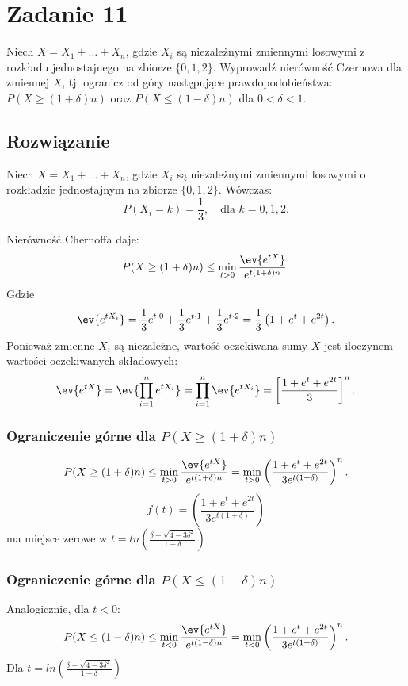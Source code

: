 \section{Zadanie 11}
Niech \(X = X_1 + \ldots + X_n\), gdzie \(X_i\) są niezależnymi zmiennymi losowymi z rozkładu jednostajnego na zbiorze \(\{0, 1, 2\}\). Wyprowadź nierówność Czernowa dla zmiennej \(X\), tj. ogranicz od góry następujące prawdopodobieństwa: \(P (X \geqslant (1 + \delta) n)\) oraz \(P (X \leqslant (1 - \delta) n)\) dla \(0 < \delta < 1\).
\subsection*{Rozwiązanie}

Niech \( X = X_1 + \ldots + X_n \), gdzie \( X_i \) są niezależnymi zmiennymi losowymi o rozkładzie jednostajnym na zbiorze \( \{0, 1, 2\} \). Wówczas:
\[
	P(X_i = k) = \frac{1}{3}, \quad \text{dla } k = 0, 1, 2.
\]

Nierówność Chernoffa daje:
\[
	P(X \geq (1+\delta)n) \leq \min_{t > 0} \frac{\ev{e^{tX}}}{e^{t(1+\delta)n}}.
\]
Gdzie
\[
	\ev{e^{t X_i}} = \frac{1}{3} e^{t \cdot 0} + \frac{1}{3} e^{t \cdot 1} + \frac{1}{3} e^{t \cdot 2} = \frac{1}{3} \left( 1 + e^t + e^{2t} \right).
\]
Ponieważ zmienne \( X_i \) są niezależne, wartość oczekiwana sumy \( X \) jest iloczynem wartości oczekiwanych składowych:
\[
	\ev{e^{tX}} =\ev{\prod_{i=1}^ne^{tX_i}}= \prod_{i=1}^n \ev{e^{tX_i}} = \left[ \frac{1 + e^t + e^{2t}}{3} \right]^n.
\]

\subsubsection*{Ograniczenie górne dla \( P(X \geq (1+\delta)n) \)}

\[
	P(X \geq (1+\delta)n) \leq \min_{t > 0} \frac{\ev{e^{tX}}}{e^{t(1+\delta)n}} = \min_{t > 0} \left( \frac{1 + e^t + e^{2t}}{3 e^{t(1+\delta)}} \right)^n.
\]
\[
	f(t)=\left( \frac{1 + e^t + e^{2t}}{3 e^{t(1+\delta)}} \right)
\]
ma miejsce zerowe w \(t = ln \left( \frac{\delta+\sqrt{4-3 \delta^2}}{1-\delta} \right)\)


\subsubsection*{Ograniczenie górne dla \( P(X \leq (1-\delta)n) \)}

Analogicznie, dla \( t < 0 \):
\[
	P(X \leq (1-\delta)n) \leq \min_{t < 0} \frac{\ev{e^{tX}}}{e^{t(1-\delta)n}} = \min_{t < 0} \left( \frac{1 + e^t + e^{2t}}{3 e^{t(1+\delta)}} \right)^n.
\]
Dla \(t = ln \left( \frac{\delta-\sqrt{4-3 \delta^2}}{1-\delta} \right)\)
